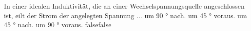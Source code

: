     {In einer idealen Induktivität, die an einer Wechselspannungsquelle angeschlossen ist, eilt der Strom der angelegten Spannung ...}
    {um 90 ° nach.}
    {um 45 ° voraus.}
    {um 45 ° nach.}
    {um 90 ° voraus.}
    {false}{false}
